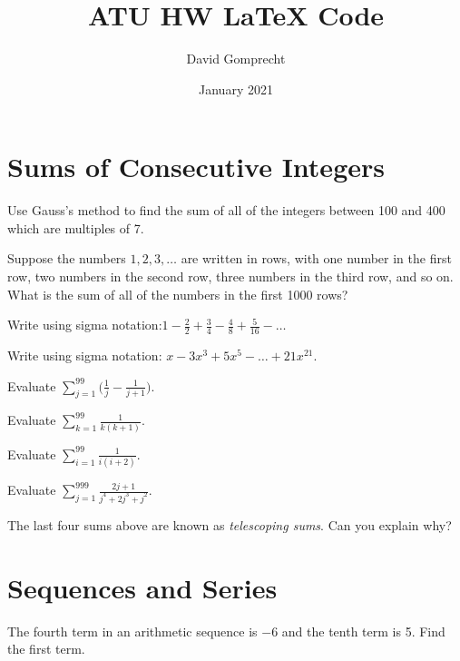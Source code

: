 \documentclass[12pt]{amsart}
\title{ATU HW LaTeX Code}
\author{David Gomprecht}
\date{January 2021}
\theoremstyle{definition}
\begin{document}
\maketitle

\section{Sums of Consecutive Integers}

\problem Use Gauss's method to find the sum of all of the integers between 100 and 400 which are multiples of 7.\vspace{.1in}

\problem Suppose the numbers $1,2,3,\dots$ are written in rows, with one number in the first row, two numbers in the second row, three numbers in the third row, and so on. What is the sum of all of the numbers in the first 1000 rows?
\begin{figure}[h]
    \centering
\end{figure}

\problem Write using sigma notation:$1-\frac{2}{2}+\frac{3}{4}-\frac{4}{8}+\frac{5}{16}-\dots$\vspace{.1in}

\problem Write using sigma notation: $x-3x^3+5x^5-\dots +21x^{21}$.\vspace{.1in}

\problem Evaluate $\displaystyle \sum_{j=1}^{99}\Big (\frac{1}{j}-\frac{1}{j+1}\Big )$.\vspace{.1in}

\problem Evaluate $\displaystyle \sum_{k=1}^{99}\frac{1}{k(k+1)}$.\vspace{.1in}

\problem Evaluate $\displaystyle \sum_{i=1}^{99}\frac{1}{i(i+2)}$.\vspace{.1in}

\problem Evaluate $\displaystyle \sum_{j=1}^{999}\frac{2j+1}{j^4+2j^3+j^2}$.\vspace{.1in}

The last four sums above are known as \emph{telescoping sums}. Can you explain why?

\newpage

\section{Sequences and Series}

\problem The fourth term in an arithmetic sequence is $-6$ and the tenth term is 5. Find the first term.\vspace{.05in}%
\end{document}
